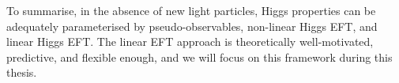 To summarise, in the absence of new light particles, Higgs properties
can be adequately parameterised by pseudo-observables, non-linear
Higgs EFT, and linear Higgs EFT. The linear EFT approach is
theoretically well-motivated, predictive, and flexible enough, and we
will focus on this framework during this thesis.




